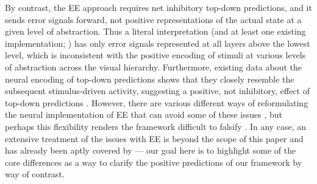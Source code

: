 \documentclass[11pt,twoside]{article}
\newif\myifpdf
\begin{document}
By contrast, the EE approach requires net inhibitory top-down predictions, and it sends error signals forward, not positive representations of the actual state at a given level of abstraction.  Thus a literal interpretation (and at least one existing implementation; ) has only error signals represented at all layers above the lowest level, which is inconsistent with the positive encoding of stimuli at various levels of abstraction across the visual hierarchy.  Furthermore, existing data about the neural encoding of top-down predictions shows that they closely resemble the subsequent stimulus-driven activity, suggesting a positive, not inhibitory, effect of top-down predictions \cite{DuhamelColbyGoldberg92,LeeMumford03,CavanaghHuntAfrazEtAl10,WalshMcGovernClarkEtAl20}.  However, there are various different ways of reformulating the neural implementation of EE that can avoid some of these issues \cite{Spratling08,BastosUsreyAdamsEtAl12}, but perhaps this flexibility renders the framework difficult to falsify \cite{KogoTrengove15}.  In any case, an extensive treatment of the issues with EE is beyond the scope of this paper and has already been aptly covered by  --- our goal here is to highlight some of the core differences as a way to clarify the positive predictions of our framework by way of contrast.
\end{document}
